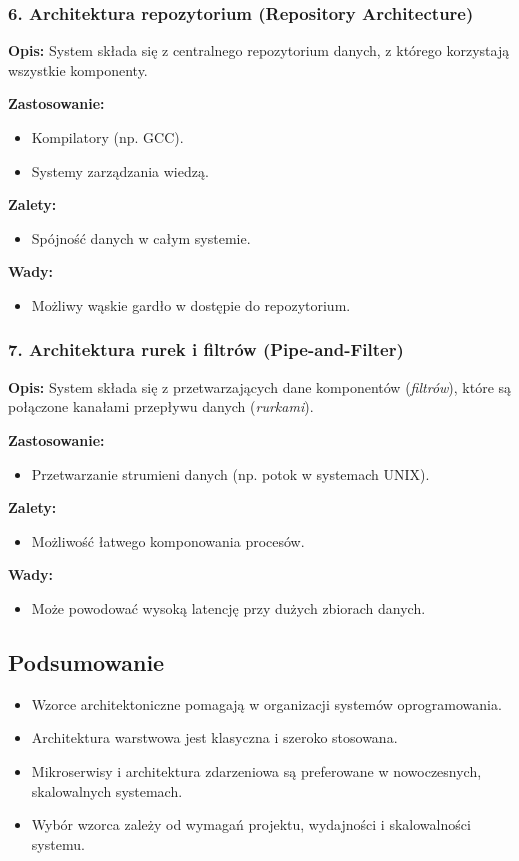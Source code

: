 \subsubsection{6. Architektura repozytorium (Repository Architecture)}
\textbf{Opis:}  
System składa się z centralnego repozytorium danych, z którego korzystają wszystkie komponenty.

\textbf{Zastosowanie:}
\begin{itemize}
    \item Kompilatory (np. GCC).
    \item Systemy zarządzania wiedzą.
\end{itemize}

\textbf{Zalety:}
\begin{itemize}
    \item Spójność danych w całym systemie.
\end{itemize}

\textbf{Wady:}
\begin{itemize}
    \item Możliwy wąskie gardło w dostępie do repozytorium.
\end{itemize}

\subsubsection{7. Architektura rurek i filtrów (Pipe-and-Filter)}
\textbf{Opis:}  
System składa się z przetwarzających dane komponentów (\textit{filtrów}), które są połączone kanałami przepływu danych (\textit{rurkami}).

\textbf{Zastosowanie:}
\begin{itemize}
    \item Przetwarzanie strumieni danych (np. potok w systemach UNIX).
\end{itemize}

\textbf{Zalety:}
\begin{itemize}
    \item Możliwość łatwego komponowania procesów.
\end{itemize}

\textbf{Wady:}
\begin{itemize}
    \item Może powodować wysoką latencję przy dużych zbiorach danych.
\end{itemize}

\subsection{Podsumowanie}
\begin{itemize}
    \item Wzorce architektoniczne pomagają w organizacji systemów oprogramowania.
    \item Architektura warstwowa jest klasyczna i szeroko stosowana.
    \item Mikroserwisy i architektura zdarzeniowa są preferowane w nowoczesnych, skalowalnych systemach.
    \item Wybór wzorca zależy od wymagań projektu, wydajności i skalowalności systemu.
\end{itemize}
